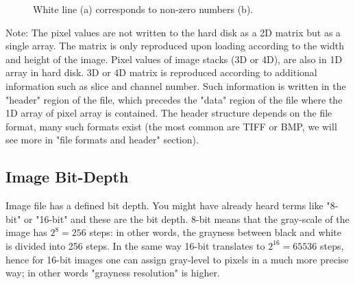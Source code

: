 \begin{figure}[htbp]
\centering
{}
\caption{ White line (a) corresponds to non-zero numbers (b).}
\label{fig:mostbasic2}
\end{figure} 


Note: The pixel values are not written to the hard disk as a 2D matrix but as
a single array. The matrix is only reproduced upon loading according to the width
and height of the image. Pixel values of image stacks (3D or 4D), are
also in 1D array in hard disk. 3D or 4D matrix is reproduced according
to additional information such as slice and channel number. Such
information is written in the
"header" region of the file, which
precedes the "data" region of the
file where the 1D array of pixel array is contained. The header structure
 depends on the file format, many such formats exist (the most common are TIFF or BMP, we will
see more in "file formats and
header" section). 



\subsection{Image Bit-Depth}
\label{subsec:bitdepth}
Image file has a defined bit depth. You might have already
heard terms like "8-bit" or
"16-bit" and these are the bit depth. 8-bit
means that the gray-scale of the image has $2^{8} = 256$
steps: in other words, the grayness between black and white is divided
into 256 steps. In the same way 16-bit translates to $2^{16} = 65536$ steps, hence for 16-bit images one can assign gray-level to pixels in a much more
precise way; in other words "grayness
resolution" is higher. 

